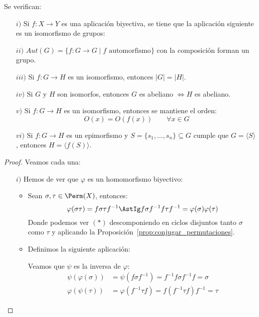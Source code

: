 \begin{prop}\label{prop:propiedades_grupos_isomorf}
    Se verifican:
    \begin{enumerate}
        \item[$i)$] Si $f:X\to Y$ es una aplicación biyectiva, se tiene que la aplicación siguiente es un isomorfismo de grupos:
        \item[$ii)$] $Aut(G) = \{f:G\to G \mid f \text{\ automorfismo}\}$ con la composición forman un grupo.
        \item[$iii)$] Si $f:G\to H$ es un isomorfismo, entonces $|G| = |H|$.
        \item[$iv)$] Si $G$ y $H$ son isomorfos, entonces $G$ es abeliano $\Longleftrightarrow H$ es abeliano.
        \item[$v)$] Si $f:G\to H$ es un isomorfismo, entonces se mantiene el orden:
            \begin{equation*}
                O(x) = O(f(x)) \qquad \forall x\in G
            \end{equation*}
        \item[$vi)$] Si $f:G\to H$ es un epimorfismo y $S=\{s_1,\ldots,s_n\}\subseteq G$ cumple que $G= \langle S \rangle $, entonces $H=\langle f(S) \rangle $.
    \end{enumerate}
    \begin{proof}
        Veamos cada una:
        \begin{enumerate}
            \item[$i)$] Hemos de ver que $\varphi$ es un homomorfismo biyectivo:
                \begin{itemize}
                    \item Sean $\sigma,\tau \in \Perm(X)$, entonces:
                        \begin{equation*}
                            \varphi(\sigma\tau) = f\sigma\tau f^{-1} \AstIg f\sigma f^{-1}f\tau f^{-1} = \varphi(\sigma)\varphi(\tau)
                        \end{equation*}
                        Donde podemos ver $(\ast)$ descomponiendo en ciclos disjuntos tanto $\sigma$ como $\tau$ y aplicando la Proposición~\ref{prop:conjugar_permutaciones}.
                    \item Definimos la siguiente aplicación:

                        Veamos que $\psi$ es la inversa de $\varphi$:
                        \begin{align*}
                            \psi(\varphi(\sigma)) &= \psi(f\sigma f^{-1}) = f^{-1}f\sigma f^{-1}f = \sigma \\
                            \varphi(\psi(\tau)) &= \varphi(f^{-1}\tau f) = f(f^{-1}\tau f)f^{-1} = \tau
                        \end{align*}


\end{itemize}
\end{enumerate}
\end{proof}
\end{prop}
